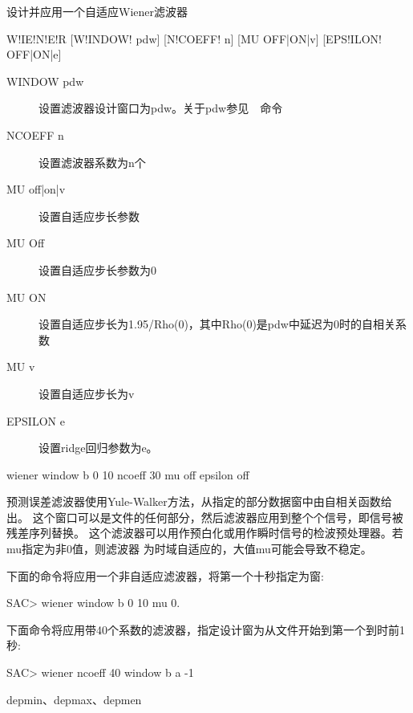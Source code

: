 \label{cmd:wiener}

设计并应用一个自适应Wiener滤波器

\begin{SACSTX}
W!IE!N!E!R [W!INDOW! pdw] [N!COEFF! n] [MU OFF|ON|v] [EPS!ILON! OFF|ON|e]
\end{SACSTX}

\begin{description}
\item [WINDOW pdw] 设置滤波器设计窗口为pdw。关于pdw参见~~命令
\item [NCOEFF n] 设置滤波器系数为n个
\item [MU off|on|v] 设置自适应步长参数
\item [MU Off] 设置自适应步长参数为0
\item [MU ON] 设置自适应步长为1.95/Rho(0)，其中Rho(0)是pdw中延迟为0时的自相关系数
\item [MU v] 设置自适应步长为v
\item [EPSILON e] 设置ridge回归参数为e。
\end{description}

\begin{SACDFT}
wiener window b 0 10 ncoeff 30 mu off epsilon off
\end{SACDFT}

预测误差滤波器使用Yule-Walker方法，从指定的部分数据窗中由自相关函数给出。
这个窗口可以是文件的任何部分，然后滤波器应用到整个个信号，即信号被残差序列替换。
这个滤波器可以用作预白化或用作瞬时信号的检波预处理器。若mu指定为非0值，则滤波器
为时域自适应的，大值mu可能会导致不稳定。

下面的命令将应用一个非自适应滤波器，将第一个十秒指定为窗:
\begin{SACCode}
SAC> wiener window b 0 10 mu 0.
\end{SACCode}

下面命令将应用带40个系数的滤波器，指定设计窗为从文件开始到第一个到时前1秒:
\begin{SACCode}
SAC> wiener ncoeff 40 window b a -1
\end{SACCode}

depmin、depmax、depmen


